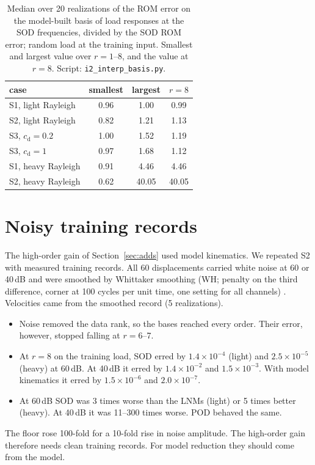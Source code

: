 \documentclass[11pt]{article}
\begin{document}
\begin{table}[tbp]
\centering\small
\caption{Median over 20 realizations of the ROM error on the model-built basis of load responses at the SOD frequencies, divided by the SOD ROM error; random load at the training input. Smallest and largest value over $r=1$--8, and the value at $r=8$. Script: \texttt{i2\_interp\_basis.py}.}
\label{tab:s-forced}
\begin{tabular}{lccc}
\toprule
case & smallest & largest & $r=8$\\ \midrule
S1, light Rayleigh & 0.96 & 1.00 & 0.99\\
S2, light Rayleigh & 0.82 & 1.21 & 1.13\\
S3, $c_{\mathrm d}=0.2$ & 1.00 & 1.52 & 1.19\\
S3, $c_{\mathrm d}=1$ & 0.97 & 1.68 & 1.12\\
S1, heavy Rayleigh & 0.91 & 4.46 & 4.46\\
S2, heavy Rayleigh & 0.62 & 40.05 & 40.05\\
\bottomrule
\end{tabular}
\end{table}

\section{Noisy training records}\label{sec:s-noise}
The high-order gain of Section~\ref{sec:adds} used model kinematics. We repeated S2 with measured training records. All 60 displacements carried white noise at 60 or 40\,dB and were smoothed by Whittaker smoothing (WH; penalty on the third difference, corner at 100 cycles per unit time, one setting for all channels) \citep{Eilers2003}. Velocities came from the smoothed record (5 realizations).
\begin{itemize}
\item Noise removed the data rank, so the bases reached every order. Their error, however, stopped falling at $r=6$--7.
\item At $r=8$ on the training load, SOD erred by $1.4\times10^{-4}$ (light) and $2.5\times10^{-5}$ (heavy) at 60\,dB. At 40\,dB it erred by $1.4\times10^{-2}$ and $1.5\times10^{-3}$. With model kinematics it erred by $1.5\times10^{-6}$ and $2.0\times10^{-7}$.
\item At 60\,dB SOD was 3 times worse than the LNMs (light) or 5 times better (heavy). At 40\,dB it was 11--300 times worse. POD behaved the same.
\end{itemize}
The floor rose 100-fold for a 10-fold rise in noise amplitude. The high-order gain therefore needs clean training records. For model reduction they should come from the model.
\end{document}
